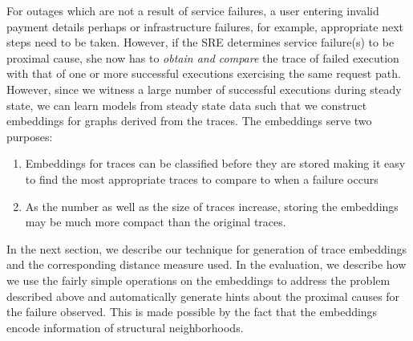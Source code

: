 For outages which are not a result of service failures, a user entering invalid payment details perhaps or infrastructure failures, for example, appropriate next steps need to be taken. However, if the SRE determines service failure(s) to be proximal cause, she now has to \emph{obtain and compare} the trace of failed execution with that of one or more successful executions exercising the same request path. However, since we witness a large number of successful executions during steady state, we can learn models from steady state data such that we construct embeddings for graphs derived from the traces. The embeddings serve two purposes:
\begin{enumerate}
\item Embeddings for traces can be classified before they are stored making it easy to find the most appropriate traces to compare to when a failure occurs
\item As the number as well as the size of traces increase, storing the embeddings may be much more compact than the original traces. 
\end{enumerate}

In the next section, we describe our technique for generation of trace embeddings and the corresponding distance measure used. In the evaluation, we describe how we use the fairly simple operations on the embeddings to address the problem described above and automatically generate hints about the proximal causes for the failure observed. This is made possible by the fact that the embeddings encode information of structural neighborhoods.

